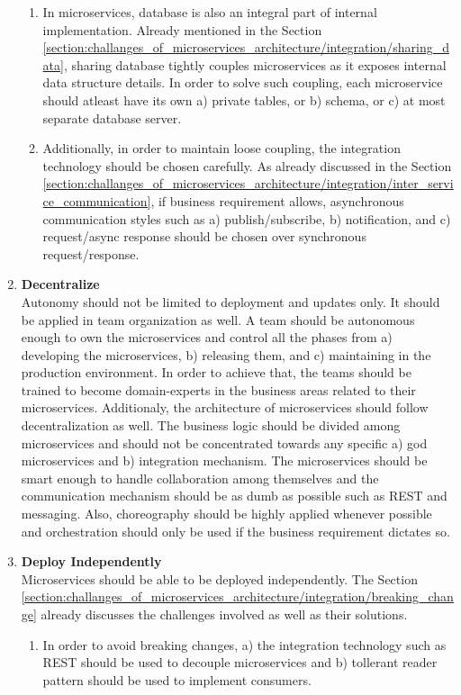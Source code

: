 \begin{enumerate}
\begin{enumerate}
\item In microservices, database is also an integral part of internal implementation. Already mentioned in the Section \ref{section:challanges_of_microservices_architecture/integration/sharing_data}, sharing database tightly couples microservices as it exposes internal data structure details. In order to solve such coupling, each microservice should atleast have its own a) private tables,  or b) schema, or c) at most separate database server.
\item Additionally, in order to maintain loose coupling, the integration technology should be chosen carefully. As already discussed in the Section \ref{section:challanges_of_microservices_architecture/integration/inter_service_communication}, if business requirement allows, asynchronous communication styles such as a) publish/subscribe, b) notification, and c) request/async response should be chosen over synchronous request/response.
\end{enumerate}
\item \textbf{Decentralize} \\
Autonomy should not be limited to deployment and updates only. It should be applied in team organization as well. A team should be autonomous enough to own the microservices and control all the phases from a) developing the microservices, b) releasing them, and  c) maintaining in the production environment. In order to achieve that, the teams should be trained to become domain-experts in the business areas related to their microservices.
Additionaly, the architecture of microservices should follow decentralization as well. The business logic should be divided among microservices and should not be concentrated towards any specific a) god microservices and b) integration mechanism. The microservices should be smart enough to handle collaboration among themselves and the communication mechanism should be as dumb as possible such as \acrshort{REST} and messaging. Also, choreography should be highly applied whenever possible and orchestration should only be used if the business requirement dictates so.
\item \textbf{Deploy Independently}\\
Microservices should be able to be deployed independently. The Section \ref{section:challanges_of_microservices_architecture/integration/breaking_change} already discusses the challenges involved as well as their solutions.
\begin{enumerate}
\item In order to avoid breaking changes, a) the integration technology such as \acrshort{REST} should be used to decouple microservices and b) tollerant reader pattern should be used to implement consumers.

\end{enumerate}
\end{enumerate}
